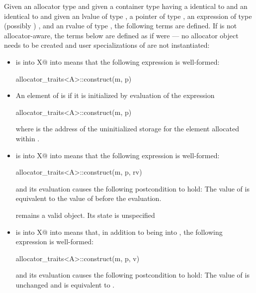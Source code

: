 \pnum
Given an allocator type 
and given a container type  having a  identical to 
and an  identical to 
and given an lvalue  of type ,
a pointer  of type ,
an expression  of type (possibly ) ,
and an rvalue  of type ,
the following terms are defined. If 
is not allocator-aware, the terms below are defined as if  were
 --- no allocator object needs to be created
and user specializations of  are not instantiated:
\begin{itemize}
\item
{} is 
{ into X@ into }
means that the following expression is well-formed:
\begin{codeblock}
allocator_traits<A>::construct(m, p)
\end{codeblock}

\item
An element of  is  if it is initialized
by evaluation of the expression
\begin{codeblock}
allocator_traits<A>::construct(m, p)
\end{codeblock}
where  is the address of the uninitialized storage for the element
allocated within .

\item
{} is 
{ into X@ into }
means that the following expression
is well-formed:
\begin{codeblock}
allocator_traits<A>::construct(m, p, rv)
\end{codeblock}
and its evaluation causes the following postcondition to hold: The value
of  is equivalent to the value of  before the evaluation.
\begin{note}
 remains a valid object. Its state is unspecified
\end{note}

\item
{} is 
{ into X@ into }
means that, in addition to  being  into
, the following expression is well-formed:
\begin{codeblock}
allocator_traits<A>::construct(m, p, v)
\end{codeblock}
and its evaluation causes the following postcondition to hold:
The value of  is unchanged and is equivalent to .


\end{itemize}
